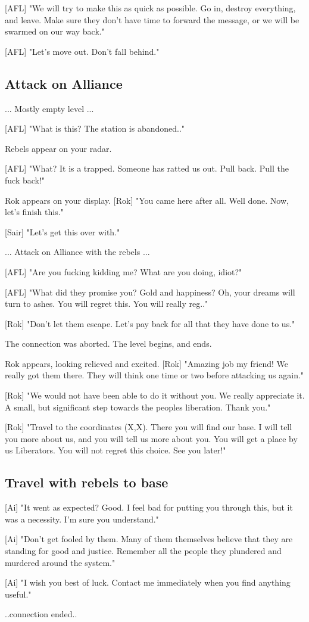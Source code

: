 \documentclass[a4paper,12pt]{article}
\begin{document}
[AFL] "We will try to make this as quick as possible. Go in, destroy everything,
and leave. Make sure they don't have time to forward the message, or we will
be swarmed on our way back."

[AFL] "Let's move out. Don't fall behind."

\subsection{Attack on Alliance}

... Mostly empty level ...

[AFL] "What is this? The station is abandoned.."

Rebels appear on your radar.

[AFL] "What? It is a trapped. Someone has ratted us out. Pull back. Pull the fuck
back!"

Rok appears on your display.
[Rok] "You came here after all. Well done. Now, let's finish this."

[Sair] "Let's get this over with."

... Attack on Alliance with the rebels ...

[AFL] "Are you fucking kidding me? What are you doing, idiot?"

[AFL] "What did they promise you? Gold and happiness? Oh, your dreams
will turn to ashes. You will regret this. You will really reg.."

[Rok] "Don't let them escape. Let's pay back for all that they have done to us."

The connection was aborted. The level begins, and ends.

Rok appears, looking relieved and excited.
[Rok] "Amazing job my friend! We really got them there. They will think one time
or two before attacking us again."

[Rok] "We would not have been able to do it without you. We really appreciate it.
A small, but significant step towards the peoples liberation. Thank you."

[Rok] "Travel to the coordinates (X,X). There you will find our base. I will tell
you more about us, and you will tell us more about you. You will get a place
by us Liberators. You will not regret this choice. See you later!"

\subsection{Travel with rebels to base}

[Ai] "It went as expected? Good. I feel bad for putting you through this,
but it was a necessity. I'm sure you understand."

[Ai] "Don't get fooled by them. Many of them themselves believe that they
are standing for good and justice. Remember all the people they plundered and
murdered around the system."

[Ai] "I wish you best of luck. Contact me immediately when you find anything useful."

..connection ended..
\end{document}

